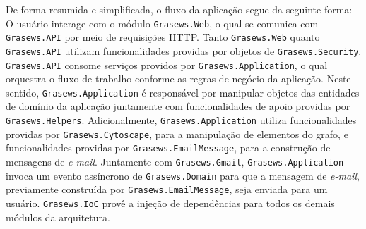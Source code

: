 De forma resumida e simplificada, o fluxo da aplicação segue da seguinte forma: O usuário interage com o módulo \texttt{Grasews.Web}, o qual se comunica com \texttt{Grasews.API} por meio de requisições HTTP. Tanto \texttt{Grasews.Web} quanto \texttt{Grasews.API} utilizam funcionalidades providas por objetos de \texttt{Grasews.Security}. \texttt{Grasews.API} consome serviços providos por \texttt{Grasews.Application}, o qual orquestra o fluxo de trabalho conforme as regras de negócio da aplicação. Neste sentido, \texttt{Grasews.Application} é responsável por manipular objetos das entidades de domínio da aplicação juntamente com funcionalidades de apoio providas por \texttt{Grasews.Helpers}. Adicionalmente, \texttt{Grasews.Application} utiliza funcionalidades providas por \texttt{Grasews.Cytoscape}, para a manipulação de elementos do grafo, e funcionalidades providas por \texttt{Grasews.EmailMessage}, para a construção de mensagens de \textit{e-mail}. Juntamente com \texttt{Grasews.Gmail}, \texttt{Grasews.Application} invoca um evento assíncrono de \texttt{Grasews.Domain} para que a mensagem de \textit{e-mail}, previamente construída por \texttt{Grasews.EmailMessage}, seja enviada para um usuário. \texttt{Grasews.IoC} provê a injeção de dependências para todos os demais módulos da arquitetura.